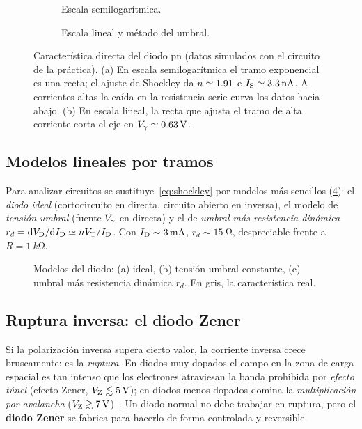 \documentclass[11pt,a4paper]{article}
\begin{document}
\begin{figure}[htbp]
  \centering
  \begin{subfigure}[b]{0.49\linewidth}\centering
    
    \caption{Escala semilogarítmica.}
    \label{fig:semilog}
  \end{subfigure}\hfill
  \begin{subfigure}[b]{0.49\linewidth}\centering
    
    \caption{Escala lineal y método del umbral.}
    \label{fig:metodo-umbral}
  \end{subfigure}
  \caption{Característica directa del diodo pn (datos simulados con el
  circuito de la práctica). (a) En escala semilogarítmica el tramo
  exponencial es una recta; el ajuste de Shockley da $n\simeq\num{1.91}$ e
  $I_{\mathrm S}\simeq\SI{3.3}{nA}$. A corrientes altas la caída en la
  resistencia serie curva los datos hacia abajo. (b) En escala lineal, la recta
  que ajusta el tramo de alta corriente corta el eje en
  $V_{\gamma}\simeq\SI{0.63}{V}$.}
  \label{fig:shockley}
\end{figure}

\subsection{Modelos lineales por tramos}

Para analizar circuitos se sustituye~\eqref{eq:shockley} por modelos más
sencillos (\cref{fig:modelos}): el \emph{diodo ideal} (cortocircuito en
directa, circuito abierto en inversa), el modelo de \emph{tensión umbral}
(fuente $V_{\gamma}$ en directa) y el de \emph{umbral más resistencia dinámica}
$r_d=\mathrm dV_{\mathrm D}/\mathrm dI_{\mathrm D}\simeq nV_{\mathrm T}/I_{\mathrm D}$. Con $I_{\mathrm D}\sim\SI{3}{mA}$,
$r_d\sim\SI{15}{\ohm}$, despreciable frente a $R=\SI{1}{k\ohm}$.

\begin{figure}[htbp]
  \centering
  
  \caption{Modelos del diodo: (a) ideal, (b) tensión umbral constante,
  (c) umbral más resistencia dinámica $r_d$. En gris, la característica real.}
  \label{fig:modelos}
\end{figure}

\subsection{Ruptura inversa: el diodo Zener}

Si la polarización inversa supera cierto valor, la corriente inversa crece
bruscamente: es la \emph{ruptura}. En diodos muy dopados el campo en la zona
de carga espacial es tan intenso que los electrones atraviesan la banda
prohibida por \emph{efecto túnel} (efecto Zener, $V_{\mathrm Z}\lesssim\SI{5}{V}$); en
diodos menos dopados domina la \emph{multiplicación por avalancha}
($V_{\mathrm Z}\gtrsim\SI{7}{V}$)~\cite{sze}. Un diodo normal no debe trabajar en
ruptura, pero el \textbf{diodo Zener} se fabrica para hacerlo de forma
controlada y reversible.
\end{document}
